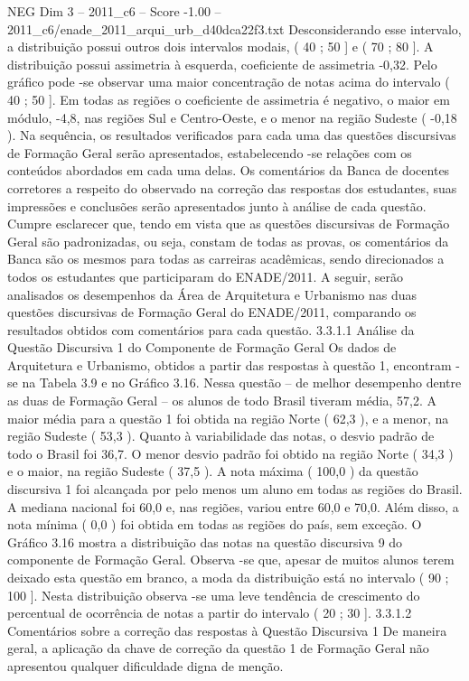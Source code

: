 \begin{textsample}{NEG Dim 3 – 2011\_c6 – Score -1.00 – 2011\_c6/enade\_2011\_arqui\_urb\_d40dca22f3.txt}
Desconsiderando esse intervalo, a distribuição possui outros dois intervalos modais, ( 40 ; 50 ] e ( 70 ; 80 ].
A distribuição possui assimetria à esquerda, coeficiente de assimetria -0,32.
Pelo gráfico pode -se observar uma maior concentração de notas acima do intervalo ( 40 ; 50 ].
Em todas as regiões o coeficiente de assimetria é negativo, o maior em módulo, -4,8, nas regiões Sul e Centro-Oeste, e o menor na região Sudeste ( -0,18 ).
Na sequência, os resultados verificados para cada uma das questões discursivas de Formação Geral serão apresentados, estabelecendo -se relações com os conteúdos abordados em cada uma delas.
Os comentários da Banca de docentes corretores a respeito do observado na correção das respostas dos estudantes, suas impressões e conclusões serão apresentados junto à análise de cada questão.
Cumpre esclarecer que, tendo em vista que as questões discursivas de Formação Geral são padronizadas, ou seja, constam de todas as provas, os comentários da Banca são os mesmos para todas as carreiras acadêmicas, sendo direcionados a todos os estudantes que participaram do ENADE/2011.
A seguir, serão analisados os desempenhos da Área de Arquitetura e Urbanismo nas duas questões discursivas de Formação Geral do ENADE/2011, comparando os resultados obtidos com comentários para cada questão. 3.3.1.1 Análise da Questão Discursiva 1 do Componente de Formação Geral Os dados de Arquitetura e Urbanismo, obtidos a partir das respostas à questão 1, encontram -se na Tabela 3.9 e no Gráfico 3.16.
Nessa questão – de melhor desempenho dentre as duas de Formação Geral – os alunos de todo Brasil tiveram média, 57,2.
A maior média para a questão 1 foi obtida na região Norte ( 62,3 ), e a menor, na região Sudeste ( 53,3 ).
Quanto à variabilidade das notas, o desvio padrão de todo o Brasil foi 36,7.
O menor desvio padrão foi obtido na região Norte ( 34,3 ) e o maior, na região Sudeste ( 37,5 ).
A nota máxima ( 100,0 ) da questão discursiva 1 foi alcançada por pelo menos um aluno em todas as regiões do Brasil.
A mediana nacional foi 60,0 e, nas regiões, variou entre 60,0 e 70,0.
Além disso, a nota mínima ( 0,0 ) foi obtida em todas as regiões do país, sem exceção.
O Gráfico 3.16 mostra a distribuição das notas na questão discursiva 9 do componente de Formação Geral.
Observa -se que, apesar de muitos alunos terem deixado esta questão em branco, a moda da distribuição está no intervalo ( 90 ; 100 ].
Nesta distribuição observa -se uma leve tendência de crescimento do percentual de ocorrência de notas a partir do intervalo ( 20 ; 30 ]. 3.3.1.2 Comentários sobre a correção das respostas à Questão Discursiva 1 De maneira geral, a aplicação da chave de correção da questão 1 de Formação Geral não apresentou qualquer dificuldade digna de menção.

\end{textsample}
